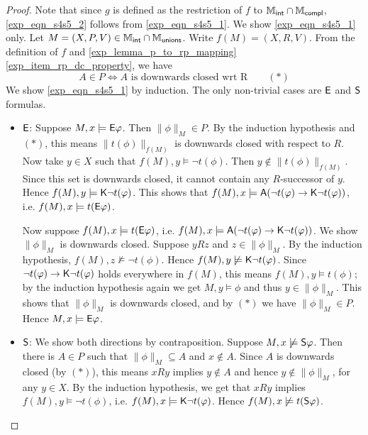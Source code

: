 \begin{proof}

    Note that since $g$ is defined as the restriction of $f$ to $\Mint \cap
    \Mcompl$, \cref{exp_eqn_s4s5_2} follows from \cref{exp_eqn_s4s5_1}. We show
    \cref{exp_eqn_s4s5_1} only.
    Let $M = (X, P, V) \in \Mint \cap \Munions$. Write $f(M) =
    (X, R, V)$. From the definition of $f$ and
    \cref{exp_lemma_p_to_rp_mapping} \cref{exp_item_rp_dc_property}, we have
    \[
        A \in P \iff A \text{ is downwards closed wrt R} \qquad(*)
    \]
    We show \cref{exp_eqn_s4s5_1} by induction. The only non-trivial cases are
    $\E$ and $\S$ formulas.

    \begin{itemize}
        \item $\E$: Suppose $M, x \models \E\phi$. Then $\|\phi\|_M \in P$. By
              the induction hypothesis and $(*)$, this means
              $\|t(\phi)\|_{f(M)}$ is downwards closed with respect to $R$. Now
              take $y \in X$ such that $f(M), y \models \neg t(\phi)$. Then $y
              \notin \|t(\phi)\|_{f(M)}$. Since this set is downwards closed,
              it cannot contain any $R$-successor of $y.$ Hence $f(M), y
              \models \K\neg t(\phi)$. This shows that $f(M), x \models \A(\neg
              t(\phi) \limplies \K\neg t(\phi))$, i.e. $f(M), x \models
              t(\E\phi)$.

              Now suppose $f(M), x \models t(\E\phi)$, i.e. $f(M), x \models
              \A(\neg t(\phi) \limplies \K\neg t(\phi))$. We show $\|\phi\|_M$
              is downwards closed. Suppose $yRz$ and $z \in \|\phi\|_M$. By the
              induction hypothesis, $f(M), z \not\models \neg t(\phi)$. Hence
              $f(M), y \not\models \K\neg t(\phi)$. Since $\neg t(\phi)
              \limplies \K\neg t(\phi)$ holds everywhere in $f(M)$, this means
              $f(M), y \models t(\phi)$; by the induction hypothesis again we
              get $M, y \models \phi$ and thus $y \in \|\phi\|_M$. This shows
              that $\|\phi\|_M$ is downwards closed, and by $(*)$ we have
              $\|\phi\|_M \in P$.  Hence $M, x \models \E\phi$.

        \item $\S$: We show both directions by contraposition. Suppose $M, x
              \not\models \S\phi$. Then there is $A \in P$ such that
              $\|\phi\|_M \subseteq A$ and $x \notin A$. Since $A$ is downwards
              closed (by $(*)$), this means $xRy$ implies $y \notin A$ and
              hence $y \notin \|\phi\|_M$, for any $y \in X$. By the induction
              hypothesis, we get that $xRy$ implies $f(M), y \models \neg
              t(\phi)$, i.e.  $f(M), x \models \K\neg t(\phi)$. Hence $f(M), x
              \not\models t(\S\phi)$.


\end{itemize}
\end{proof}
